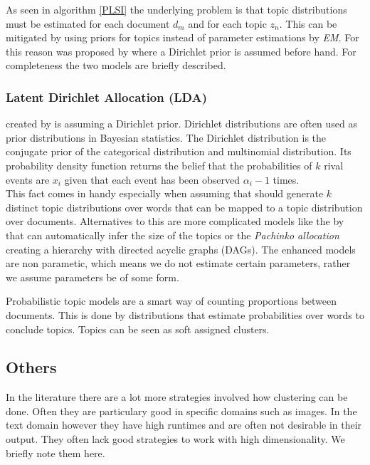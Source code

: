       As seen in algorithm \ref{PLSI} the underlying problem is that topic distributions must be estimated for each document $d_m$ and for each topic $z_n$. This can be mitigated by using priors for topics instead of parameter estimations by \emph{EM}. For this reason \ldafull{} was proposed by \cite{LDA2003} where a Dirichlet prior is assumed before hand. For completeness the two models are briefly described.

      \subsubsection*{Latent Dirichlet Allocation (LDA)}
      \label{sec:lda}

        \ldalong{} created by \cite{LDA2003} is \plsi{} assuming a Dirichlet prior. Dirichlet distributions are often used as prior distributions in Bayesian statistics. The Dirichlet distribution is the conjugate prior of the categorical distribution and multinomial distribution. Its probability density function returns the belief that the probabilities of $k$ rival events are $x_i$ given that each event has been observed $\alpha_i-1$ times.\\
        This fact comes in handy especially when assuming that \lda{} should generate $k$ distinct topic distributions over words that can be mapped to a topic distribution over documents. \cite{TopicModelsBlei2012}
        Alternatives to this are more complicated models like the \hdpfull{} by \cite{HDP2006} that can automatically infer the size of the topics or the \emph{Pachinko allocation} creating a hierarchy with directed acyclic graphs (DAGs). \cite{NonParametricBayes2007} The enhanced models are non parametic, which means we do not estimate certain parameters, rather we assume parameters be of some form.
        
      Probabilistic topic models are a smart way of counting proportions between documents. This is done by distributions that estimate probabilities over words to conclude topics. Topics can be seen as soft assigned clusters.

    \subsection{Others}
    In the literature there are a lot more strategies involved how clustering can be done. Often they are particulary good in specific domains such as images. In the text domain however they have high runtimes and are often not desirable in their output. They often lack good strategies to work with high dimensionality. We briefly note them here.

